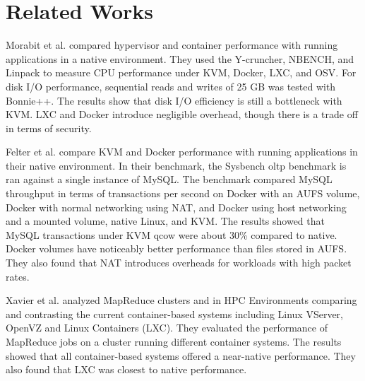 \documentclass[11pt]{article}
\begin{document}
\section{Related Works}
Morabit et al. \cite{morabit} compared hypervisor and container performance with running applications in a native environment. They used the Y-cruncher, NBENCH, and Linpack to measure CPU performance under KVM, Docker, LXC, and OSV. For disk I/O performance, sequential reads and writes of 25 GB was tested with Bonnie++. The results show that disk I/O efficiency is still a bottleneck with KVM. LXC and Docker introduce negligible overhead, though there is a trade off in terms of security. 

Felter et al. \cite{felter} compare KVM and Docker performance with running applications in their native environment. In their benchmark, the Sysbench oltp benchmark is ran against a single instance of MySQL. The benchmark compared MySQL throughput in terms of transactions per second on Docker with an AUFS volume, Docker with normal networking using NAT, and Docker using host networking and a mounted volume, native Linux, and KVM. The results showed that MySQL transactions under KVM qcow were about 30\% compared to native. Docker volumes have noticeably better performance than files stored in AUFS. They also found that NAT introduces overheads for workloads with high packet rates. 

Xavier et al. \cite{xavier} analyzed MapReduce clusters and in HPC Environments comparing and contrasting the current container-based systems including Linux VServer, OpenVZ and Linux Containers (LXC). They evaluated the performance of MapReduce jobs on a cluster running different container systems. The results showed that all container-based systems offered a near-native performance. They also found that LXC was closest to native performance. 
\end{document}
